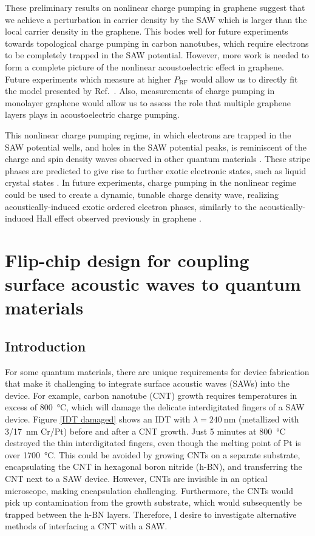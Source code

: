 \documentclass[double,12pt,1in,seploa]{beavtex}
\let\Oldsection\section
\renewcommand{\section}{\FloatBarrier\Oldsection}
\begin{document}
These preliminary results on nonlinear charge pumping in graphene suggest that we achieve a perturbation in carrier density by the SAW which is larger than the local carrier density in the graphene. This bodes well for future experiments towards topological charge pumping in carbon nanotubes, which require electrons to be completely trapped in the SAW potential. However, more work is needed to form a complete picture of the nonlinear acoustoelectric effect in graphene. Future experiments which measure at higher $P_{\mathrm{RF}}$ would allow us to directly fit the model presented by Ref.\ \cite{rotter_nonlinear_1999}. Also, measurements of charge pumping in monolayer graphene would allow us to assess the role that multiple graphene layers plays in acoustoelectric charge pumping. 

This nonlinear charge pumping regime, in which electrons are trapped in the SAW potential wells, and holes in the SAW potential peaks, is reminiscent of the charge and spin density waves observed in other quantum materials \cite{rahnejat_charge_2011,pasztor_multiband_2021}. These stripe phases are predicted to give rise to further exotic electronic states, such as liquid crystal states \cite{fradkin_liquid-crystal_1999}. In future experiments, charge pumping in the nonlinear regime could be used to create a dynamic, tunable charge density wave, realizing acoustically-induced exotic ordered electron phases, similarly to the acoustically-induced Hall effect observed previously in graphene \cite{zhao_acoustically_2022}. 


\chapter{Flip-chip design for coupling surface acoustic waves to quantum materials} \label{flip-chip chapter}

\section{Introduction}

For some quantum materials, there are unique requirements for device fabrication that make it challenging to integrate surface acoustic waves (SAWs) into the device. For example, carbon nanotube (CNT) growth requires temperatures in excess of \SI{800}{\celsius}, which will damage the delicate interdigitated fingers of a SAW device. Figure \ref{IDT damaged} shows an IDT with $\lambda = \SI{240}{\nano\meter}$ (metallized with 3/\SI{17}{\nano\meter} Cr/Pt) before and after a CNT growth. Just 5 minutes at \SI{800}{\celsius} destroyed the thin interdigitated fingers, even though the melting point of Pt is over \SI{1700}{\celsius}. This could be avoided by growing CNTs on a separate substrate, encapsulating the CNT in hexagonal boron nitride (h-BN), and transferring the CNT next to a SAW device. However, CNTs are invisible in an optical microscope, making encapsulation challenging. Furthermore, the CNTs would pick up contamination from the growth substrate, which would subsequently be trapped between the h-BN layers. Therefore, I desire to investigate alternative methods of interfacing a CNT with a SAW.
\end{document}

